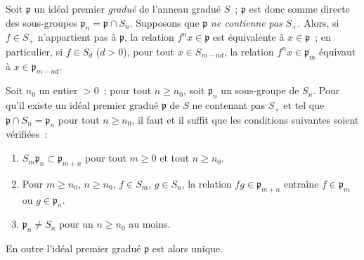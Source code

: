 \begin{env}[2.1.8]
\label{II.2.1.8-fr}
Soit $\mathfrak{p}$ un idéal premier \emph{gradué} de l'anneau gradué $S$~;
$\mathfrak{p}$ est donc somme directe des sous-groupes
$\mathfrak{p}_n=\mathfrak{p}\cap S_n$. Supposons que $\mathfrak{p}$ \emph{ne
contienne pas} $S_+$. Alors, si $f\in S_+$ n'appartient pas à
$\mathfrak{p}$, la relation $f^nx\in\mathfrak{p}$ est équivalente à
$x\in\mathfrak{p}$~; en particulier, si $f\in S_d$ ($d>0$), pour tout
$x\in S_{m-nd}$, la relation $f^nx\in\mathfrak{p}_m$ équivaut à
$x\in\mathfrak{p}_{m-nd}$.
\end{env}

\begin{proposition}[2.1.9]
\label{II.2.1.9-fr}
Soit $n_0$ un entier $>0$~; pour tout $n\geq n_0$, soit $\mathfrak{p}_n$ un
sous-groupe de $S_n$. Pour qu'il existe un idéal premier gradué
$\mathfrak{p}$ de $S$ ne contenant pas $S_+$ et tel que
$\mathfrak{p}\cap S_n=\mathfrak{p}_n$ pour tout $n\geq n_0$, il faut et il
suffit que les conditions suivantes soient vérifiées~:
\begin{enumerate}
  \item[$1^\circ$] $S_m\mathfrak{p}_n\subset\mathfrak{p}_{m+n}$ pour tout
    $m\geq 0$ et tout $n\geq n_0$.
  \item[$2^\circ$] Pour $m\geq n_0$, $n\geq n_0$, $f\in S_m$, $g\in S_n$,
    la relation $fg\in\mathfrak{p}_{m+n}$ entraîne
    $f\in\mathfrak{p}_m$ ou $g\in\mathfrak{p}_n$.
  \item[$3^\circ$] $\mathfrak{p}_n\neq S_n$ pour un $n\geq n_0$ au moins.
\end{enumerate}
En outre l'idéal premier gradué $\mathfrak{p}$ est alors unique.
\end{proposition}

